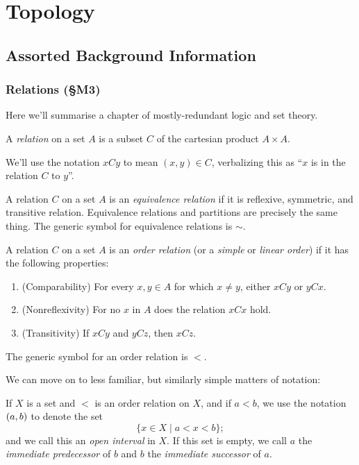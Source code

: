 \documentclass{report}
\begin{document}
\part{Topology}
\chapter{Assorted Background Information}
\section{Relations (\S M3) }
Here we'll summarise a chapter of mostly-redundant logic and set theory.
\begin{definition}
  A \emph{relation} on a set $A$ is a subset $C$ of the cartesian product $A \times A$.
\end{definition}
We'll use the notation $xCy$ to mean $(x,y) \in C$, verbalizing this  as ``$x$ is in the relation $C$ to $y$''.
\begin{definition}
  A relation $C$ on a set $A$  is an \emph{equivalence relation} if it is reflexive, symmetric, and transitive relation.
  Equivalence relations and partitions are precisely the same thing.
  The generic symbol for equivalence relations is $\sim$.
\end{definition}
\begin{definition}
  A relation $C$ on a set $A$ is an \emph{order relation} (or a \emph{simple} or \emph{linear order}) if it has the following properties:
  \begin{enumerate}[label={(\arabic*)}]
    \item (Comparability) For every $x,y \in A$ for which $x \neq y$, either $xCy$ or $yCx$.
    \item (Nonreflexivity) For no $x$ in $A$ does the relation $xCx$ hold.
    \item (Transitivity) If $xCy$ and $yCz$, then $xCz$.
  \end{enumerate}
  The generic symbol for an order relation is $<$.
\end{definition}

We can move on to less familiar, but similarly simple matters of notation:
\begin{definition}
  If $X$ is a set and $<$ is an order relation on $X$, and if $a < b$, we use the notation $\left( a,b \right)$ to denote the set 
  \[
    \{ x \in X \mid a < x < b \};
  \]
  and we call this an \emph{open interval} in $X$. 
  If this set is empty, we call $a$ the \emph{immediate predecessor} of $b$ and $b$ the \emph{immediate successor} of $a$.
\end{definition}
\end{document}
